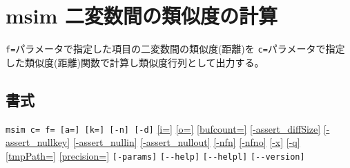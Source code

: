 
%

\section{msim 二変数間の類似度の計算\label{sect:msim}}
\verb|f=|パラメータで指定した項目の二変数間の類似度(距離)を
\verb|c=|パラメータで指定した類似度(距離)関数で計算し類似度行列として出力する。

\subsection*{書式}
\verb/msim c= f= [a=] [k=] [-n] [-d]/
\hyperref[sect:option_i]{[i=]}
\hyperref[sect:option_o]{[o=]}
\hyperref[sect:option_bufcount]{[bufcount=]} 
\hyperref[sect:option_assert_diffSize]{[-assert\_diffSize]}
\hyperref[sect:option_assert_nullkey]{[-assert\_nullkey]}
\hyperref[sect:option_assert_nullin]{[-assert\_nullin]}
\hyperref[sect:option_assert_nullout]{[-assert\_nullout]}
\hyperref[sect:option_nfn]{[-nfn]} 
\hyperref[sect:option_nfno]{[-nfno]}  
\hyperref[sect:option_x]{[-x]}
\hyperref[sect:option_x]{[-q]}
\hyperref[sect:option_option_tmppath]{[tmpPath=]}
\hyperref[sect:option_precision]{[precision=]}
\verb|[-params]|
\verb|[--help]|
\verb|[--helpl]|
\verb|[--version]|\\

